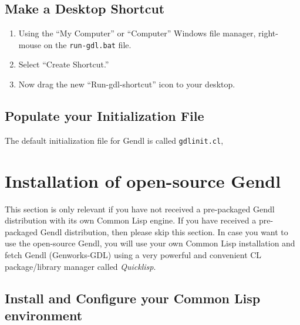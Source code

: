 \documentclass [11pt]{book}
\begin{document}
\subsection{Make a Desktop Shortcut}

\label{subsec:makeadesktopshortcut}



\begin{enumerate}

\item Using the ``My Computer'' or ``Computer'' Windows file manager, right-mouse on the \texttt{run-gdl.bat} file.

\item Select ``Create Shortcut.''

\item Now drag the new ``Run-gdl-shortcut'' icon to your desktop.

\end{enumerate}



\subsection{Populate your Initialization File}

\label{subsec:populateyourinitializationfile}

The default initialization file for Gendl is called \texttt{gdlinit.cl}, 

\section{Installation of open-source Gendl}

\label{sec:installationofopen-sourcegendl}

This section is only relevant if you have not received a
pre-packaged Gendl distribution with its own Common Lisp engine.  If
you have received a pre-packaged Gendl distribution, then please skip
this section. In case you want to use the open-source Gendl, you will
use your own Common Lisp installation and fetch Gendl (Genworks-GDL)
using a very powerful and convenient CL package/library manager
called \emph{Quicklisp}.

\subsection{Install and Configure your Common Lisp environment}

\label{subsec:installandconfigureyourcommonlispenvironment}
\end{document}
